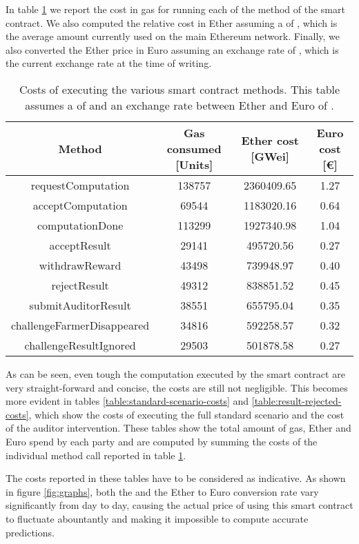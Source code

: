 In table \ref{table:method-costs} we report the cost in gas for running each of the method of the smart contract. We also computed the relative cost in Ether assuming a  of \gaspricegwei, which is the average amount currently used on the main Ethereum network. Finally, we also converted the Ether price in Euro assuming an exchange rate of \ethtoeur, which is the current exchange rate at the time of writing.

\begin{table}[p]
    \caption[Cost of executing smart contract methods]{Costs of executing the various smart contract methods. This table assumes a  of \gaspricegwei and an exchange rate between Ether and Euro of \ethtoeur.}
    \centering
    \label{table:method-costs}
    \begin{tabular}{c c c c}
        \toprule
        Method & Gas consumed [Units] & Ether cost [GWei] & Euro cost [€]\\ 
        \midrule
        requestComputation & 138757 & 2360409.65 & 1.27 \\ acceptComputation & 69544 & 1183020.16 & 0.64 \\ computationDone & 113299 & 1927340.98 & 1.04 \\ acceptResult & 29141 & 495720.56 & 0.27 \\ withdrawReward & 43498 & 739948.97 & 0.40 \\ rejectResult & 49312 & 838851.52 & 0.45 \\ submitAuditorResult & 38551 & 655795.04 & 0.35 \\ challengeFarmerDisappeared & 34816 & 592258.57 & 0.32 \\ challengeResultIgnored & 29503 & 501878.58 & 0.27 \\
        \bottomrule
    \end{tabular}
\end{table}

As can be seen, even tough the computation executed by the smart contract are very straight-forward and concise, the costs are still not negligible. This becomes more evident in tables \ref{table:standard-scenario-costs} and \ref{table:result-rejected-costs}, which show the costs of executing the full standard scenario and the cost of the auditor intervention. These tables show the total amount of gas, Ether and Euro spend by each party and are computed by summing the costs of the individual method call reported in table \ref{table:method-costs}.

The costs reported in these tables have to be considered as indicative. As shown in figure \ref{fig:graphs}, both the  and the Ether to Euro conversion rate vary significantly from day to day, causing the actual price of using this smart contract to fluctuate abountantly and making it impossible to compute accurate predictions.

